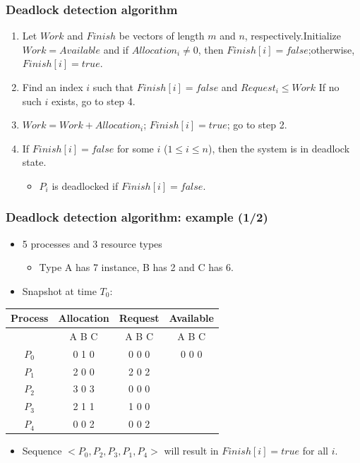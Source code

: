 \documentclass[CJKutf8,xcolor=pdftex,dvipsnames,table]{beamer}
\begin{document}
\begin{CJK*}{UTF8}{song}
  \begin{frame}
  \frametitle{Deadlock detection algorithm} \pause
  \begin{enumerate}
  \item{Let $Work$ and $Finish$ be vectors of length $m$ and $n$, respectively.\newline \pause Initialize $Work = Available$ and if $Allocation_i \neq 0$, then $Finish[i] = false$;otherwise, $Finish[i] = true$.} \pause
  \item{Find an index $i$ such that \newline \pause
      $Finish[i] = false$ and $Request_i \leq Work$ \newline \pause
      If no such $i$ exists, go to step 4. } \pause
  \item{$Work = Work + Allocation_i$; $Finish[i] = true$; \newline go to step 2.} \pause
  \item{If $Finish[i] = false$ for some $i$ ($1 \leq i \leq n$), then the system is in deadlock state.} \pause
    \begin{itemize}
    \item{$P_i$ is deadlocked if $Finish[i] = false$.}
    \end{itemize}
  \end{enumerate}
  \end{frame}

  \begin{frame}
  \frametitle{Deadlock detection algorithm: example (1/2)} \pause
  \begin{itemize}
  \item{5 processes and 3 resource types} \pause
    \begin{itemize}
    \item{Type A has 7 instance, B has 2 and C has 6.} \pause
    \end{itemize}
  \item{Snapshot at time $T_0$:} \pause
  \end{itemize}
  \begin{tabular}{cccc}
    Process & Allocation & Request & Available\\
    \hline
            & A B C      & A B C   & A B C\\
    $P_0$   & 0 1 0      & 0 0 0   & 0 0 0\\
    $P_1$   & 2 0 0      & 2 0 2   &      \\
    $P_2$   & 3 0 3      & 0 0 0   &      \\
    $P_3$   & 2 1 1      & 1 0 0   &      \\
    $P_4$   & 0 0 2      & 0 0 2   &      \\
  \end{tabular} \pause
  \begin{itemize}
  \item{Sequence $<P_0, P_2, P_3, P_1, P_4>$ will result in $Finish[i] = true$ for all $i$.}
  \end{itemize}
  \end{frame}


\end{CJK*}
\end{document}
